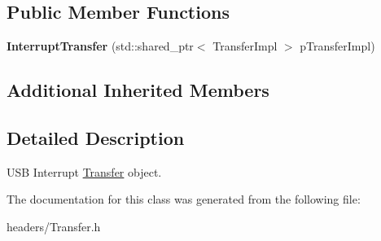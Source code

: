 \subsection*{Public Member Functions}
\begin{DoxyCompactItemize}
\item 
\hypertarget{class_lib_u_s_b_1_1_interrupt_transfer_a79401af995e4992996ac716a2fa223ba}{{\bfseries Interrupt\-Transfer} (std\-::shared\-\_\-ptr$<$ Transfer\-Impl $>$ p\-Transfer\-Impl)}\label{class_lib_u_s_b_1_1_interrupt_transfer_a79401af995e4992996ac716a2fa223ba}

\end{DoxyCompactItemize}
\subsection*{Additional Inherited Members}


\subsection{Detailed Description}
U\-S\-B Interrupt \hyperlink{class_lib_u_s_b_1_1_transfer}{Transfer} object. 

The documentation for this class was generated from the following file\-:\begin{DoxyCompactItemize}
\item 
headers/Transfer.\-h\end{DoxyCompactItemize}
